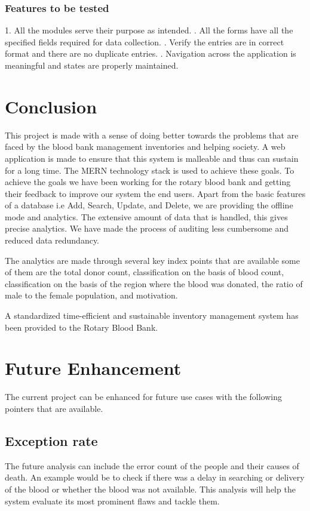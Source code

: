 \documentclass[BTech]{srmuthesis}
\begin{document}
\subsection{Features to be tested}
1. All the modules serve their purpose as intended.
. All the forms have all the specified fields required for data collection.
. Verify the entries are in correct format and there are no duplicate entries.
. Navigation across the application is meaningful and states are properly maintained.

\chapter{Conclusion}
This project is made with a sense of doing better towards the problems that are faced by the blood bank management inventories and helping society. A web application is made to ensure that this system is malleable and thus can sustain for a long time. The \ac{MERN} technology stack is used to achieve these goals. To achieve the goals we have been working for the rotary blood bank and getting their feedback to improve our system the end users. Apart from the basic features of a database i.e Add, Search, Update, and Delete, we are providing the offline mode and analytics. The extensive amount of data that is handled, this gives precise analytics. We have made the process of auditing less cumbersome and reduced data redundancy.\par
The analytics are made through several key index points that are available some of them are the total donor count, classification on the basis of blood count, classification on the basis of the region where the blood was donated, the ratio of male to the female population, and motivation.\par
A standardized time-efficient and sustainable inventory management system has been provided to the Rotary Blood Bank.


\chapter{Future Enhancement}
The current project can be enhanced for future use cases with the following pointers that are available.
\section{Exception rate}
The future analysis can include the error count of the people and their causes of death. An example would be to check if there was a delay in searching or delivery of the blood or whether the blood was not available. This analysis will help the system evaluate its most prominent flaws and tackle them.
\end{document}

